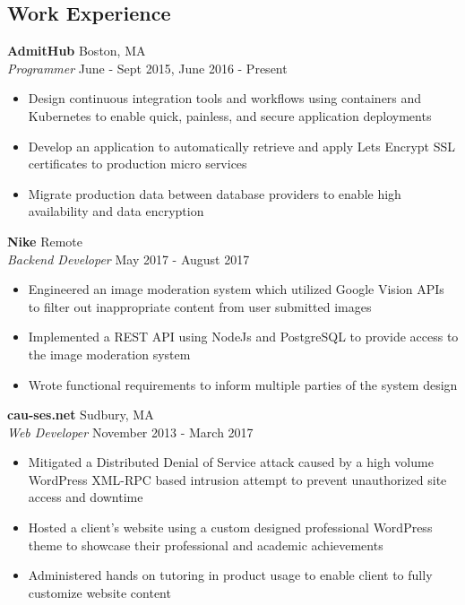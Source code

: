\documentclass[10pt]{article}
\begin{document}
\begin{flushleft}
\section{Work Experience}
	\textbf{AdmitHub} \hfill Boston, MA \\
	\textit{Programmer} \hfill June - Sept 2015, June 2016 - Present \\
	\begin{itemize}
		\item Design continuous integration tools and workflows using 
		      containers and Kubernetes to enable quick, painless, and 
		      secure application deployments
		\item Develop an application to automatically retrieve and apply 
		      Lets Encrypt SSL certificates to production micro services
		\item Migrate production data between database providers to 
		      enable high availability and data encryption
	\end{itemize}

	\vspace{1em}
	\textbf{Nike} \hfill Remote \\
	\textit{Backend Developer} \hfill May 2017 - August 2017 \\
	\begin{itemize}
		\item Engineered an image moderation system which utilized 
		      Google Vision APIs to filter out inappropriate content 
		      from user submitted images
		\item Implemented a REST API using NodeJs and PostgreSQL to 
		      provide access to the image moderation system
		\item Wrote functional requirements to inform multiple parties  
		      of the system design
	\end{itemize}

	\vspace{1em}
	\textbf{cau-ses.net} \hfill Sudbury, MA \\
	\textit{Web Developer} \hfill November 2013 - March 2017 \\
	\begin{itemize}
		\item Mitigated a Distributed Denial of Service attack caused  
		      by a high volume WordPress XML-RPC based intrusion 
		      attempt to prevent unauthorized site access and 
		      downtime
		\item Hosted a client's website using a custom designed 
		      professional WordPress theme to showcase their
		      professional and academic achievements
		\item Administered hands on tutoring in product usage to enable
		      client to fully customize website content
	\end{itemize}


\end{flushleft}
\end{document}
